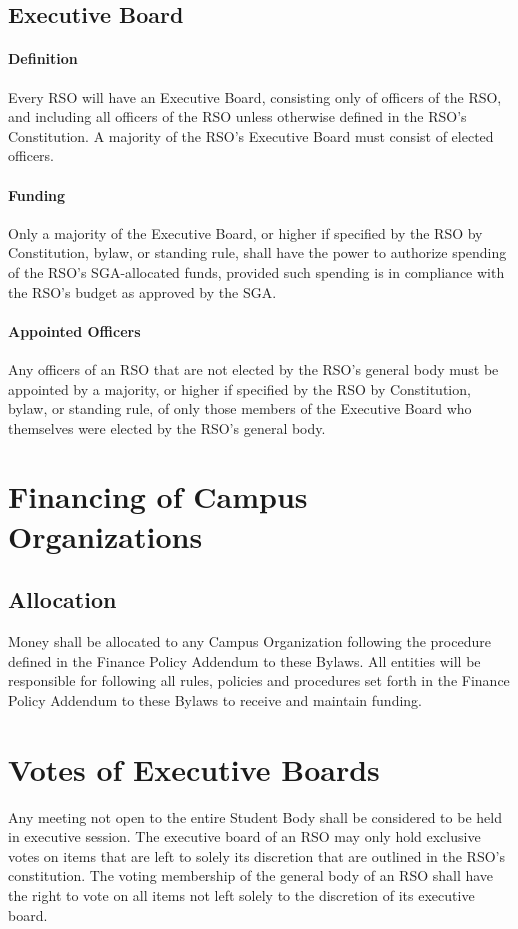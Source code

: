 \documentclass[12pt]{scrreprt}
\begin{document}
\subsection{Executive Board}

\paragraph{Definition}
Every RSO will have an Executive Board, consisting only of officers of
the RSO, and including all officers of the RSO unless otherwise
defined in the RSO’s Constitution. A majority of the RSO’s Executive
Board must consist of elected officers.

\paragraph{Funding}
Only a majority of the Executive Board, or higher if specified by the
RSO by Constitution, bylaw, or standing rule, shall have the power to
authorize spending of the RSO’s SGA-allocated funds, provided such
spending is in compliance with the RSO’s budget as approved by the
SGA.

\paragraph{Appointed Officers}
Any officers of an RSO that are not elected by the RSO’s general body
must be appointed by a majority, or higher if specified by the RSO by
Constitution, bylaw, or standing rule, of only those members of the
Executive Board who themselves were elected by the RSO’s general body.

\section{Financing of Campus Organizations}

\subsection{Allocation}
Money shall be allocated to any Campus Organization following the procedure 
defined in the Finance Policy Addendum to these Bylaws. All entities will be responsible for following all rules, policies and procedures set forth in the Finance Policy Addendum to these Bylaws to receive and maintain funding.

\section{Votes of Executive Boards}
Any meeting not open to the entire Student Body shall be considered to be held 
in executive session. The executive board of an RSO may only hold exclusive votes on items that are left to solely its discretion that are outlined in the RSO’s constitution. The voting membership of the general body of an RSO shall have the right to vote on all items not left solely to the discretion of its executive board.
\end{document}
